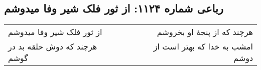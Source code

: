 \begin{center}
\section*{رباعی شماره ۱۱۲۴: از ثور فلک شیر وفا میدوشم}
\label{sec:1124}
\begin{longtable}{l p{0.5cm} r}
از ثور فلک شیر وفا میدوشم
&&
هرچند که از پنجهٔ او بخروشم
\\
هرچند که دوش حلقه بد در گوشم
&&
امشب به خدا که بهتر است از دوشم
\\
\end{longtable}
\end{center}

